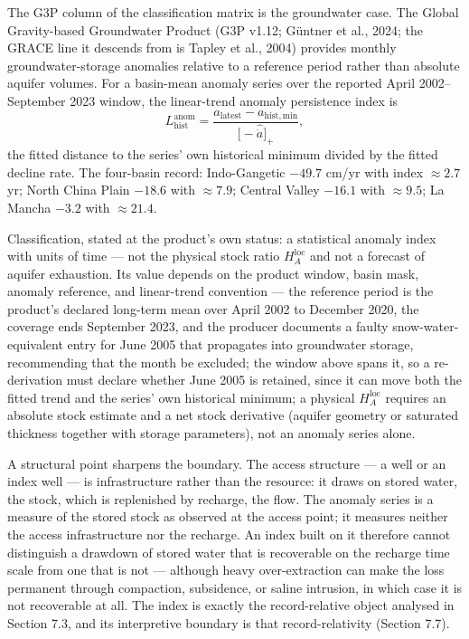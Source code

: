 \documentclass[11pt]{article}
\begin{document}
The G3P column of the classification matrix is the groundwater case. The
Global Gravity-based Groundwater Product (G3P v1.12; G\"untner et al.,
2024; the GRACE line it descends from is Tapley et al., 2004) provides
monthly groundwater-storage anomalies relative to a reference period
rather than absolute aquifer volumes. For a basin-mean anomaly series
over the reported April 2002--September 2023 window, the linear-trend
anomaly persistence index is
\[L_{\mathrm{hist}}^{\mathrm{anom}} = \frac{a_{\mathrm{latest}} - a_{\mathrm{hist,min}}}{\bigl[ -\widehat{\dot a} \bigr]_+},\]
the fitted distance to the series' own historical minimum divided by the
fitted decline rate. The four-basin record: Indo-Gangetic \(-49.7\)
cm/\allowbreak{}yr with index \(\approx 2.7\) yr; North China Plain \(-18.6\) with
\(\approx 7.9\); Central Valley \(-16.1\) with \(\approx 9.5\); La
Mancha \(-3.2\) with \(\approx 21.4\).

Classification, stated at the product's own status: a statistical
anomaly index with units of time --- not the physical stock ratio
\(H_A^{\mathrm{loc}}\) and not a forecast of aquifer exhaustion. Its value depends on the product window, basin mask, anomaly reference, and linear-trend convention
--- the reference period is the product's declared long-term mean over April 2002 to December 2020,
the coverage ends September 2023, and the producer documents a faulty snow-water-equivalent entry for
June 2005 that propagates into groundwater storage, recommending that the month be excluded; the
window above spans it, so a re-derivation must declare whether June 2005 is retained, since it can
move both the fitted trend and the series' own historical minimum; a physical \(H_A^{\mathrm{loc}}\) requires an
absolute stock estimate and a net stock derivative (aquifer geometry or
saturated thickness together with storage parameters), not an anomaly
series alone.

A structural point sharpens the boundary. The access structure --- a
well or an index well --- is infrastructure rather than the resource: it
draws on stored water, the stock, which is replenished by recharge, the
flow. The anomaly series is a measure of the stored stock as observed at
the access point; it measures neither the access infrastructure nor the
recharge. An index built on it therefore cannot distinguish a drawdown
of stored water that is recoverable on the recharge time scale from one
that is not --- although heavy over-extraction can make the loss
permanent through compaction, subsidence, or saline intrusion, in which
case it is not recoverable at all. The index is exactly the
record-relative object analysed in Section 7.3, and its interpretive
boundary is that record-relativity (Section 7.7).
\end{document}
